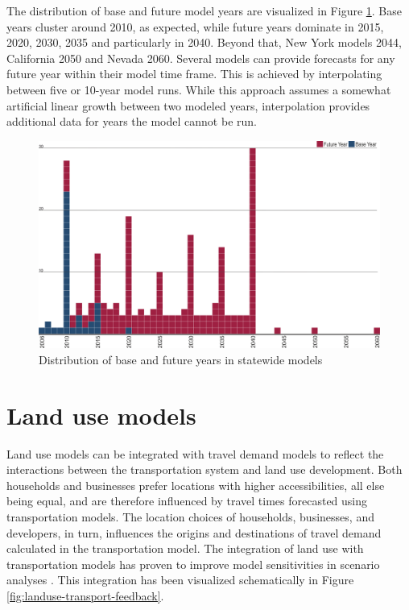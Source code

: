 The distribution of base and future model years are visualized in Figure \ref{fig:base-and-future-years}. Base years cluster around 2010, as expected, while future years dominate in 2015, 2020, 2030, 2035 and particularly in 2040. Beyond that, New York models 2044, California 2050 and Nevada 2060. Several models can provide forecasts for any future year within their model time frame. This is achieved by interpolating between five or 10-year model runs. While this approach assumes a somewhat artificial linear growth between two modeled years, interpolation provides additional data for years the model cannot be run.

\begin{figure}   %
\centering
\includegraphics[width=6.4in]{graphics/28-base-and-future-years}
\caption{Distribution of base and future years in statewide models}
\label{fig:base-and-future-years}
\end{figure}

\section{Land use models}

Land use models can be integrated with travel demand models to reflect the interactions between the transportation system and land use development. Both households and businesses prefer locations with higher accessibilities, all else being equal, and are therefore influenced by travel times forecasted using transportation models. The location choices of households, businesses, and developers, in turn, influences the origins and destinations of travel demand calculated in the transportation model. The integration of land use with transportation models has proven to improve model sensitivities in scenario analyses \citep{conder02}. This integration has been visualized schematically in Figure \ref{fig:landuse-transport-feedback}.

